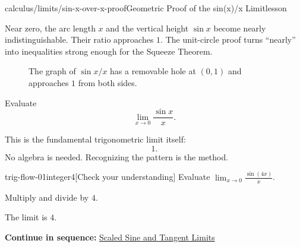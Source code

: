 \documentclass[11pt,openany]{book}
\theoremstyle{bgplain}
\newcounter{bgcheck}[section]
\newcommand{\webnext}[2]{%
  \par\addvspace{1.2em}\noindent{\color{BGLine}\rule{\textwidth}{0.35pt}}\par\smallskip
  {\small\color{BGGray}\textbf{Continue in sequence:} \hyperlink{web:#1}{#2}}\par
}
\begin{document}
\begin{webpage}{calculus/limits/sin-x-over-x-proof}{Geometric Proof of the sin(x)/x Limit}{lesson}
\begin{bgconcept}
Near zero, the arc length \(x\) and the vertical height \(\sin x\) become nearly indistinguishable. Their ratio approaches \(1\). The unit-circle proof turns ``nearly'' into inequalities strong enough for the Squeeze Theorem.
\end{bgconcept}

\begin{figure}[htbp]
\centering
{}
\caption{The graph of \(\sin x/x\) has a removable hole at \((0,1)\) and approaches \(1\) from both sides.}
\label{fig:sinc}
\end{figure}

\begin{bgguided}[title={Use the exact pattern}]
Evaluate
\[
  \lim_{x\to0}\frac{\sin x}{x}.
\]

\begin{bgsolution}
This is the fundamental trigonometric limit itself:
\[
  \boxed{1}.
\]
No algebra is needed. Recognizing the pattern is the method.
\end{bgsolution}
\end{bgguided}


\begin{bgcheck}{trig-flow-01}{integer}{4}[Check your understanding]
Evaluate \(\lim_{x\to0}\frac{\sin(4x)}x\).
\begin{bghint}
Multiply and divide by \(4\).
\end{bghint}
\begin{bgreveal}
The limit is \(4\).
\end{bgreveal}
\end{bgcheck}


\webnext{calculus/limits/scaled-sine-tangent}{Scaled Sine and Tangent Limits}
\end{webpage}
\end{document}
